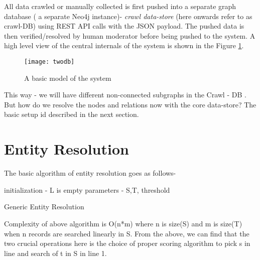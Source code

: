 All data crawled or manually collected is first pushed into a separate graph database ( a separate Neo4j instance)-  \emph{crawl data-store} (here onwards refer to as crawl-DB) using REST API calls with the JSON payload. The pushed data is then verified/resolved by human moderator before being pushed to the system. A high level view of the central internals of the system is shown in the Figure \ref{fig:twodb}.

\begin{figure}[H]
\begin{center}  
\texttt{[image: twodb]} 
\caption{A basic model of the system}
\label{fig:twodb}
\end{center}
\end{figure}

This way - we will have different non-connected subgraphs in the Crawl - DB .  
But how do we resolve the nodes and relations now with the core data-store? The basic setup id described in the next section. 

\section{Entity Resolution}
\label{dataer}

The basic algorithm of entity resolution goes as follows-

\begin{algorithm}[H]
initialization - L is empty \;
parameters - S,T, threshold \;
 \caption{Generic Entity Resolution}
\end{algorithm}

Complexity of above algorithm is O(n*m) where n is size(S) and m is size(T) when n records are searched linearly in S.
        From the above, we can find that the two crucial operations here is the choice of proper scoring algorithm to pick s in line and search of t in S in line 1.


